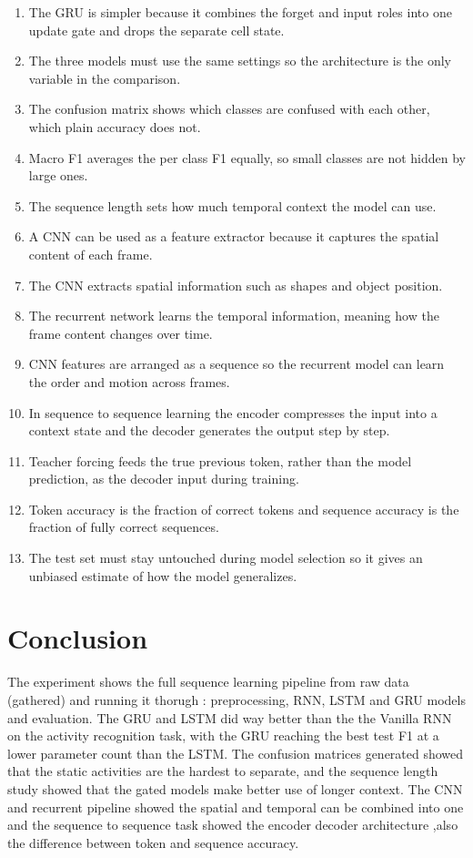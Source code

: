 \documentclass[12pt]{article}
\begin{document}
\begin{enumerate}
\item The GRU is simpler because it combines the forget and input roles into one update gate and drops the separate cell state.
\item The three models must use the same settings so the architecture is the only variable in the comparison.
\item The confusion matrix shows which classes are confused with each other, which plain accuracy does not.
\item Macro F1 averages the per class F1 equally, so small classes are not hidden by large ones.
\item The sequence length sets how much temporal context the model can use.
\item A CNN can be used as a feature extractor because it captures the spatial content of each frame.
\item The CNN extracts spatial information such as shapes and object position.
\item The recurrent network learns the temporal information, meaning how the frame content changes over time.
\item CNN features are arranged as a sequence so the recurrent model can learn the order and motion across frames.
\item In sequence to sequence learning the encoder compresses the input into a context state and the decoder generates the output step by step.
\item Teacher forcing feeds the true previous token, rather than the model prediction, as the decoder input during training.
\item Token accuracy is the fraction of correct tokens and sequence accuracy is the fraction of fully correct sequences.
\item The test set must stay untouched during model selection so it gives an unbiased estimate of how the model generalizes.
\end{enumerate}

\section{Conclusion}
The experiment shows the full sequence learning pipeline from raw  data (gathered) and running it thorugh : preprocessing, RNN, LSTM and GRU models and evaluation. The GRU and LSTM  did way better than the  the Vanilla RNN on the activity recognition task, with the GRU reaching the best test F1 at a lower parameter count than the LSTM.
The confusion matrices generated showed that the static activities are the hardest to separate, and the sequence length study showed that the gated models make better use of longer context. The CNN and recurrent pipeline showed the spatial and temporal  can be combined into one   and the sequence to sequence task showed the encoder decoder architecture ,also the difference between token and sequence accuracy. 
\end{document}
